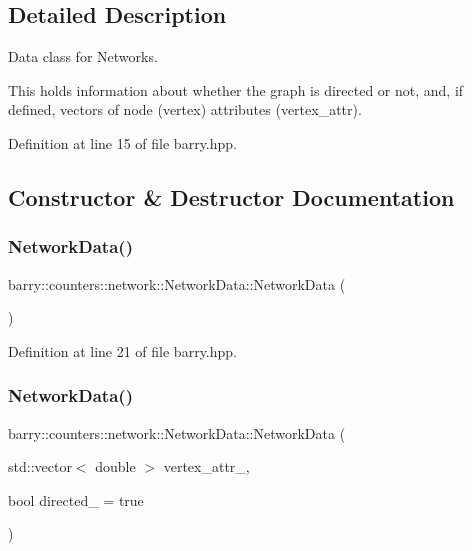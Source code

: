 \subsection{Detailed Description}
Data class for Networks. 

This holds information about whether the graph is directed or not, and, if defined, vectors of node (vertex) attributes ({\ttfamily vertex\+\_\+attr}). 

Definition at line 15 of file barry.\+hpp.



\subsection{Constructor \& Destructor Documentation}
\mbox{\label{classbarry_1_1counters_1_1network_1_1_network_data_a285d956b719012c5296aa537aca17fb2}} 
\subsubsection{\texorpdfstring{Network\+Data()}{NetworkData()}\hspace{0.1cm}{\footnotesize\ttfamily [1/3]}}
{\footnotesize\ttfamily barry\+::counters\+::network\+::\+Network\+Data\+::\+Network\+Data (\begin{DoxyParamCaption}{ }\end{DoxyParamCaption})\hspace{0.3cm}{\ttfamily [inline]}}



Definition at line 21 of file barry.\+hpp.

\mbox{\label{classbarry_1_1counters_1_1network_1_1_network_data_a6db461d607e95bc04dfb527f3422142d}} 
\subsubsection{\texorpdfstring{Network\+Data()}{NetworkData()}\hspace{0.1cm}{\footnotesize\ttfamily [2/3]}}
{\footnotesize\ttfamily barry\+::counters\+::network\+::\+Network\+Data\+::\+Network\+Data (\begin{DoxyParamCaption}\item[{std\+::vector$<$ double $>$}]{vertex\+\_\+attr\+\_\+,  }\item[{bool}]{directed\+\_\+ = {\ttfamily true} }\end{DoxyParamCaption})\hspace{0.3cm}{\ttfamily [inline]}}



